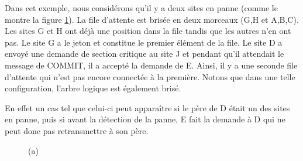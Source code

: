 Dans cet exemple, nous considérons qu'il y a deux sites en panne (comme le montre la figure \ref{fault_tolerant_ex1}). La file d'attente est brisée en deux morceaux (G,H et A,B,C). Les sites G et H ont déjà une position dans la file tandis que les autres n'en ont pas. Le site G a le jeton et constitue le premier élément de la file. Le site D a envoyé une demande de section critique au site J et pendant qu'il attendait le message de COMMIT, il a accepté la demande de E. Ainsi, il y a une seconde file d'attente qui n'est pas encore connectée à la première. Notons que dans une telle configuration, l'arbre logique est également brisé.
\par{}En effet un cas tel que celui-ci peut apparaître si le père de D était un des sites en panne, puis si avant la détection de la panne, E fait la demande à D qui ne peut donc pas retransmettre à son père.

\begin{figure}[H]
\centering
	\hspace{1cm}
	\caption{(a)\label{fault_tolerant_ex1}}
\end{figure}

